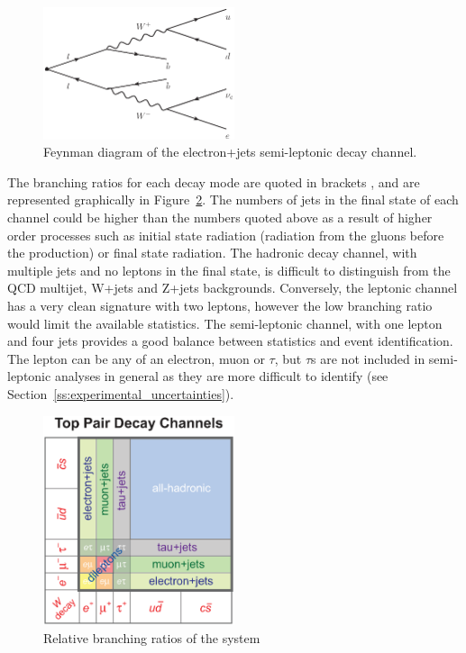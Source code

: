 \begin{figure}[hbtp]
   \centering
     \includegraphics[width=0.5\textwidth]{Chapters/03_Theory/Images/semileptonic_decay}\hfill
     \caption[Feynman diagram of the electron+jets semi-leptonic \ttbar decay channel.]{Feynman diagram of the
     electron+jets semi-leptonic \ttbar decay channel.}
     \label{fig:semileptonic_decay}
\end{figure}

The branching ratios for each decay mode are quoted in brackets \cite{Agashe:2014kda}, and are represented
graphically in Figure~\ref{fig:ttbar_branching_ratios}. The numbers of jets in the final state of each channel
could be higher than the numbers quoted above as a result of higher order processes such as initial state
radiation (radiation from the gluons before the \ttbar production) or final state radiation. The hadronic
decay channel, with multiple jets and no leptons in the final state, is difficult to distinguish from the QCD
multijet, W+jets and Z+jets backgrounds. Conversely, the leptonic channel has a very clean signature with two
leptons, however the low branching ratio would limit the available statistics. The semi-leptonic channel, with
one lepton and four jets provides a good balance between statistics and event identification. The lepton can
be any of an electron, muon or $\tau$, but $\tau$s are not included in semi-leptonic \tquark analyses in
general as they are more difficult to identify (see Section~\ref{ss:experimental_uncertainties}).

\begin{figure}[hbtp]
   \centering
     \includegraphics[width=0.5\textwidth]{Chapters/03_Theory/Images/top_pair_decay_channels}\hfill
     \caption[Relative branching ratios of the \ttbar system]{Relative branching ratios of the \ttbar system}
     \label{fig:ttbar_branching_ratios}
\end{figure}

